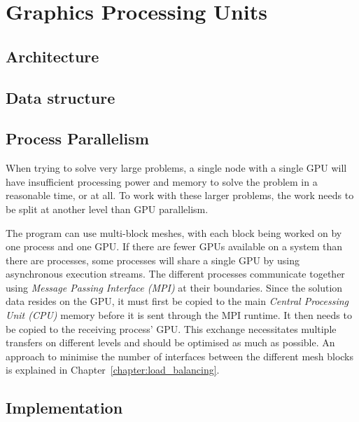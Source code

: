 \chapter{Graphics Processing Units} \label{chapter:graphics_processing_units} 

\section{Architecture} \label{section:graphics_processing_units:architecture}

\section{Data structure} \label{section:graphics_processing_units:data_structure}

\section{Process Parallelism} \label{section:graphics_processing_units:process_parallelism}

When trying to solve very large problems, a single node with a single GPU will have insufficient
processing power and memory to solve the problem in a reasonable time, or at all. To work with these
larger problems, the work needs to be split at another level than GPU parallelism.  

The program can use multi-block meshes, with each block being worked on by one process and one GPU.
If there are fewer GPUs available on a system than there are processes, some processes will share a
single GPU by using asynchronous execution streams. The different processes communicate together
using \textit{Message Passing Interface (MPI)} at their boundaries. Since the solution data resides
on the GPU, it must first be copied to the main \textit{Central Processing Unit (CPU)} memory before
it is sent through the MPI runtime. It then needs to be copied to the receiving process' GPU. This
exchange necessitates multiple transfers on different levels and should be optimised as much as
possible. An approach to minimise the number of interfaces between the different mesh blocks is
explained in Chapter~\ref{chapter:load_balancing}.

\section{Implementation} \label{section:graphics_processing_units:implementation}
